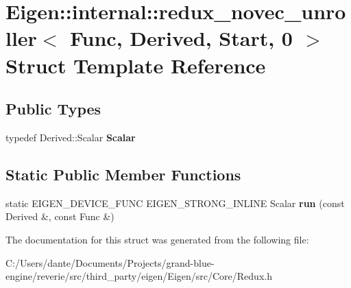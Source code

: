 \hypertarget{struct_eigen_1_1internal_1_1redux__novec__unroller_3_01_func_00_01_derived_00_01_start_00_010_01_4}{}\section{Eigen\+::internal\+::redux\+\_\+novec\+\_\+unroller$<$ Func, Derived, Start, 0 $>$ Struct Template Reference}
\label{struct_eigen_1_1internal_1_1redux__novec__unroller_3_01_func_00_01_derived_00_01_start_00_010_01_4}
\subsection*{Public Types}
\begin{DoxyCompactItemize}
\item 
\mbox{\label{struct_eigen_1_1internal_1_1redux__novec__unroller_3_01_func_00_01_derived_00_01_start_00_010_01_4_ad1af54e129a6f11fc04d3a06ae09a460}} 
typedef Derived\+::\+Scalar {\bfseries Scalar}
\end{DoxyCompactItemize}
\subsection*{Static Public Member Functions}
\begin{DoxyCompactItemize}
\item 
\mbox{\label{struct_eigen_1_1internal_1_1redux__novec__unroller_3_01_func_00_01_derived_00_01_start_00_010_01_4_ad18dab49dd99ec887429bc454edcb05f}} 
static E\+I\+G\+E\+N\+\_\+\+D\+E\+V\+I\+C\+E\+\_\+\+F\+U\+NC E\+I\+G\+E\+N\+\_\+\+S\+T\+R\+O\+N\+G\+\_\+\+I\+N\+L\+I\+NE Scalar {\bfseries run} (const Derived \&, const Func \&)
\end{DoxyCompactItemize}


The documentation for this struct was generated from the following file\+:\begin{DoxyCompactItemize}
\item 
C\+:/\+Users/dante/\+Documents/\+Projects/grand-\/blue-\/engine/reverie/src/third\+\_\+party/eigen/\+Eigen/src/\+Core/Redux.\+h\end{DoxyCompactItemize}
